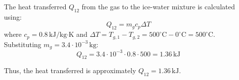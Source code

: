 The heat transferred \( Q_{12} \) from the gas to the ice-water mixture is calculated using:  
\[
Q_{12} = m_g c_p \Delta T
\]  
where \( c_p = 0.8 \, \text{kJ/kg·K} \) and \( \Delta T = T_{g,1} - T_{g,2} = 500^\circ\text{C} - 0^\circ\text{C} = 500^\circ\text{C} \). Substituting \( m_g = 3.4 \cdot 10^{-3} \, \text{kg} \):  
\[
Q_{12} = 3.4 \cdot 10^{-3} \cdot 0.8 \cdot 500 = 1.36 \, \text{kJ}
\]  

Thus, the heat transferred is approximately \( Q_{12} = 1.36 \, \text{kJ} \).